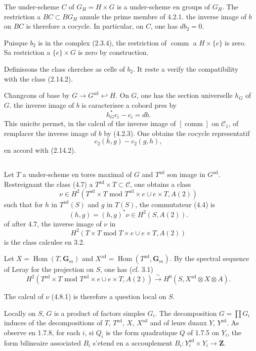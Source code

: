 \documentclass[11pt,a4paper]{article}
\theoremstyle{plain}
\theoremstyle{definition}
\DeclareMathOperator{\Hom}{Hom}
\DeclareMathOperator{\ad}{ad}
\DeclareMathOperator{\comm}{comm}
\begin{document}
The under-scheme $C$ of $G_H = H \times G$ is a under-scheme en groups of $G_H$. The restriction a $BC \subset BG_H$ annule the prime membre of 4.2.1. the inverse image of $b$ on $BC$ is therefore a cocycle. In particular, on $C$, one has $db_2 = 0$.

Puisque $b_2$ is in the complex (2.3.4), the restriction of $\comm$ a $H \times \{e\}$ is zero. Sa restriction a $\{e\} \times G$ is zero by construction.

Definissons the class cherchee as celle of $b_2$. It reste a verify the compatibility with the class (2.14.2).

Changcons of base by $G \to G^{\ad} \hookleftarrow H$. On $G$, one has the section universelle $h_G$ of $G$. the inverse image of $b$ is caracterisee a cobord pres by
\[
h_G^* c_i - c_i = db.
\]
This unicite permet, in the calcul of the inverse image of $[\comm]$ on $\mathscr{C}_1$, of remplacer the inverse image of $b$ by (4.2.3). One obtains the cocycle representatif
\[
c_2(h, g) - c_2(g, h),
\]
en accord with (2.14.2).

\subsection{}\label{4.8}

Let $T$ a under-scheme en tores maximal of $G$ and $T^{\ad}$ son image in $G^{\ad}$. Restreignant the class (4.7) a $T^{\ad} \times T \subset \mathscr{C}$, one obtains a class
\begin{equation}\label{4.8.1}
\nu \in H^2(T^{\ad} \times T \text{ mod } T^{\ad} \times e \cup e \times T, A(2))
\end{equation}
such that for $h$ in $T^{\ad}(S)$ and $g$ in $T(S)$, the commutateur (4.4) is
\[
(h, g) = (h, g)^* \nu \in H^2(S, A(2)).
\]
of after 4.7, the inverse image of $\nu$ in
\[
H^2(T \times T \text{ mod } T \times e \cup e \times T, A(2))
\]
is the class calculee en 3.2.

Let $X = \Hom(T, \mathbf{G}_m)$ and $X^{\ad} = \Hom(T^{\ad}, \mathbf{G}_m)$. By the spectral sequence of Leray for the projection on $S$, one has (cf. 3.1)
\begin{equation}\label{4.8.2}
H^2(T^{\ad} \times T \text{ mod } T^{\ad} \times e \cup e \times T, A(2)) \xrightarrow{\sim} H^0(S, X^{\ad} \otimes X \otimes A).
\end{equation}

The calcul of $\nu$ (4.8.1) is therefore a question local on $S$.

Locally on $S$, $G$ is a product of factors simples $G_i$. The decomposition $G = \prod G_i$ induces of the decompositions of $T$, $T^{\ad}$, $X$, $X^{\ad}$ and of leurs duaux $Y$, $Y^{\ad}$. As observe en 1.7.8, for each $i$, si $Q_i$ is the form quadratique $Q$ of 1.7.5 on $Y_i$, the form bilineaire associated $B_i$ s'etend en a accouplement $B_i : Y_i^{\ad} \times Y_i \to \mathbf{Z}$.
\end{document}
